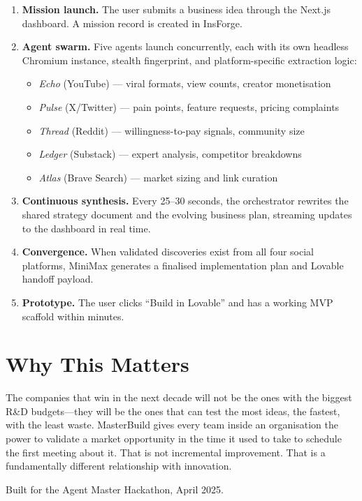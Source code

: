 \documentclass[11pt, letterpaper]{article}
\begin{document}
\begin{enumerate}[nosep]
  \item \textbf{Mission launch.} The user submits a business idea through the
        Next.js dashboard. A mission record is created in InsForge.
  \item \textbf{Agent swarm.} Five agents launch concurrently, each with its
        own headless Chromium instance, stealth fingerprint, and
        platform-specific extraction logic:
        \begin{itemize}[nosep]
          \item \emph{Echo} (YouTube) --- viral formats, view counts, creator monetisation
          \item \emph{Pulse} (X/Twitter) --- pain points, feature requests, pricing complaints
          \item \emph{Thread} (Reddit) --- willingness-to-pay signals, community size
          \item \emph{Ledger} (Substack) --- expert analysis, competitor breakdowns
          \item \emph{Atlas} (Brave Search) --- market sizing and link curation
        \end{itemize}
  \item \textbf{Continuous synthesis.} Every 25--30 seconds, the orchestrator
        rewrites the shared strategy document and the evolving business plan,
        streaming updates to the dashboard in real time.
  \item \textbf{Convergence.} When validated discoveries exist from all four
        social platforms, MiniMax generates a finalised implementation plan
        and Lovable handoff payload.
  \item \textbf{Prototype.} The user clicks ``Build in Lovable'' and has a
        working MVP scaffold within minutes.
\end{enumerate}

\section{Why This Matters}

The companies that win in the next decade will not be the ones with the biggest
R\&D budgets---they will be the ones that can test the most ideas, the fastest,
with the least waste. MasterBuild gives every team inside an organisation the
power to validate a market opportunity in the time it used to take to schedule
the first meeting about it. That is not incremental improvement. That is a
fundamentally different relationship with innovation.

\vfill
\begin{center}
  \small\color{muted}
  Built for the Agent Master Hackathon, April 2025.
\end{center}
\end{document}
